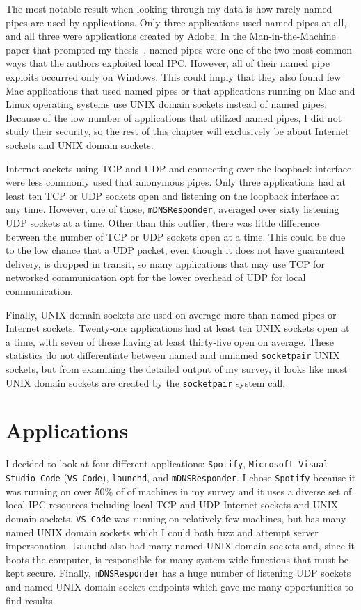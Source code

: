The most notable result when looking through my data is how rarely named pipes are used by applications.  Only three applications used named pipes at all, and all three were applications created by Adobe.  In the Man-in-the-Machine paper that prompted my thesis~\cite{MitMa}, named pipes were one of the two most-common ways that the authors exploited local IPC.  However, all of their named pipe exploits occurred only on Windows.  This could imply that they also found few Mac applications that used named pipes or that applications running on Mac and Linux operating systems use UNIX domain sockets instead of named pipes.  Because of the low number of applications that utilized named pipes, I did not study their security, so the rest of this chapter will exclusively be about Internet sockets and UNIX domain sockets.

Internet sockets using TCP and UDP and connecting over the loopback interface were less commonly used that anonymous pipes.  Only three applications had at least ten TCP or UDP sockets open and listening on the loopback interface at any time.  However, one of those, \texttt{mDNSResponder}, averaged over sixty listening UDP sockets at a time.  Other than this outlier, there was little difference between the number of TCP or UDP sockets open at a time.  This could be due to the low chance that a UDP packet, even though it does not have guaranteed delivery, is dropped in transit, so many applications that may use TCP for networked communication opt for the lower overhead of UDP for local communication.

Finally, UNIX domain sockets are used on average more than named pipes or Internet sockets.  Twenty-one applications had at least ten UNIX sockets open at a time, with seven of these having at least thirty-five open on average.  These statistics do not differentiate between named and unnamed \texttt{socketpair} UNIX sockets, but from examining the detailed output of my survey, it looks like most UNIX domain sockets are created by the \texttt{socketpair} system call.

\section{Applications}
\label{sec:applications}
I decided to look at four different applications: \texttt{Spotify}, \texttt{Microsoft Visual Studio Code} (\texttt{VS Code}), \texttt{launchd}, and \texttt{mDNSResponder}.  I chose \texttt{Spotify} because it was running on over 50\% of of machines in my survey and it uses a diverse set of local IPC resources including local TCP and UDP Internet sockets and UNIX domain sockets.  \texttt{VS Code} was running on relatively few machines, but has many named UNIX domain sockets which I could both fuzz and attempt server impersonation.  \texttt{launchd} also had many named UNIX domain sockets and, since it boots the computer, is responsible for many system-wide functions that must be kept secure.  Finally, \texttt{mDNSResponder} has a huge number of listening UDP sockets and named UNIX domain socket endpoints which gave me many opportunities to find results.

